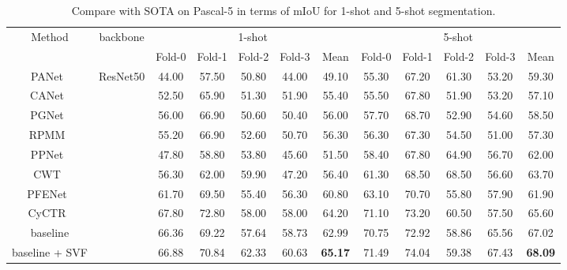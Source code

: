 \documentclass{article}
\begin{document}
\begin{table}[h]\scriptsize
\centering
\setlength\tabcolsep{4pt}
\renewcommand\arraystretch{1.3}
\caption{Compare with SOTA on Pascal-5\cite{shaban2017one} in terms of mIoU for 1-shot and 5-shot segmentation.}
\label{tab:voc}
\begin{tabular}{c|c|ccccc|ccccc}
\hline
\multirow{2}{*}{Method} & \multirow{2}{*}{backbone}  & \multicolumn{5}{c|}{1-shot}               & \multicolumn{5}{c}{5-shot}                \\ \cline{3-12} 
                        &                            & Fold-0 & Fold-1 & Fold-2 & Fold-3 & Mean  & Fold-0 & Fold-1 & Fold-2 & Fold-3 & Mean  \\ \hline
PANet~\cite{wang2019panet}                  & \multirow{10}{*}{ResNet50} & 44.00  & 57.50  & 50.80  & 44.00  & 49.10 & 55.30  & 67.20  & 61.30  & 53.20  & 59.30 \\
CANet~\cite{zhang2019canet}                  &                            & 52.50  & 65.90  & 51.30  & 51.90  & 55.40 & 55.50  & 67.80  & 51.90  & 53.20  & 57.10 \\
PGNet~\cite{zhang2019pyramid}                  &                            & 56.00  & 66.90  & 50.60  & 50.40  & 56.00 & 57.70  & 68.70  & 52.90  & 54.60  & 58.50 \\
RPMM~\cite{yang2020prototype}                   &                            & 55.20  & 66.90  & 52.60  & 50.70  & 56.30 & 56.30  & 67.30  & 54.50  & 51.00  & 57.30 \\
PPNet~\cite{liu2020part}                  &                            & 47.80  & 58.80  & 53.80  & 45.60  & 51.50 & 58.40  & 67.80  & 64.90  & 56.70  & 62.00 \\
CWT~\cite{lu2021simpler}                     &                            & 56.30  & 62.00  & 59.90  & 47.20  & 56.40 & 61.30  & 68.50  & 68.50  & 56.60  & 63.70 \\
PFENet~\cite{tian2020prior}                  &                            & 61.70  & 69.50  & 55.40  & 56.30  & 60.80 & 63.10  & 70.70  & 55.80  & 57.90  & 61.90 \\
CyCTR~\cite{zhang2021few}                   &                            & 67.80  & 72.80  & 58.00  & 58.00  & 64.20 & 71.10  & 73.20  & 60.50  & 57.50  & 65.60 \\ \cline{1-1} \cline{3-12} 
baseline                &                            & 66.36  & 69.22  & 57.64  & 58.73  & 62.99 & 70.75  & 72.92  & 58.86  & 65.56  & 67.02 \\
baseline + SVF          &                            & 66.88  & 70.84  & 62.33  & 60.63  & \textbf{65.17} & 71.49  & 74.04  & 59.38  & 67.43  & \textbf{68.09} \\ \hline
\end{tabular}
\end{table}
\end{document}
